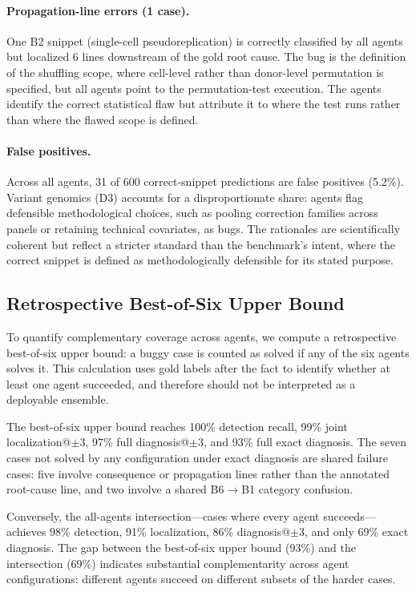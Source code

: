 \documentclass[11pt]{article}
\begin{document}
\paragraph{Propagation-line errors (1 case).}
One B2 snippet (single-cell pseudoreplication) is correctly classified by all agents but localized 6 lines downstream of the gold root cause. The bug is the definition of the shuffling scope, where cell-level rather than donor-level permutation is specified, but all agents point to the permutation-test execution. The agents identify the correct statistical flaw but attribute it to where the test runs rather than where the flawed scope is defined.

\paragraph{False positives.}
Across all agents, 31 of 600 correct-snippet predictions are false positives (5.2\%). Variant genomics (D3) accounts for a disproportionate share: agents flag defensible methodological choices, such as pooling correction families across panels or retaining technical covariates, as bugs. The rationales are scientifically coherent but reflect a stricter standard than the benchmark's intent, where the correct snippet is defined as methodologically defensible for its stated purpose.

\subsection{Retrospective Best-of-Six Upper Bound}

To quantify complementary coverage across agents, we compute a retrospective best-of-six upper bound: a buggy case is counted as solved if any of the six agents solves it. This calculation uses gold labels after the fact to identify whether at least one agent succeeded, and therefore should not be interpreted as a deployable ensemble.

The best-of-six upper bound reaches 100\% detection recall, 99\% joint localization@$\pm$3, 97\% full diagnosis@$\pm$3, and 93\% full exact diagnosis. The seven cases not solved by any configuration under exact diagnosis are shared failure cases: five involve consequence or propagation lines rather than the annotated root-cause line, and two involve a shared B6$\to$B1 category confusion.

Conversely, the all-agents intersection---cases where every agent succeeds---achieves 98\% detection, 91\% localization, 86\% diagnosis@$\pm$3, and only 69\% exact diagnosis. The gap between the best-of-six upper bound (93\%) and the intersection (69\%) indicates substantial complementarity across agent configurations: different agents succeed on different subsets of the harder cases.
\end{document}
